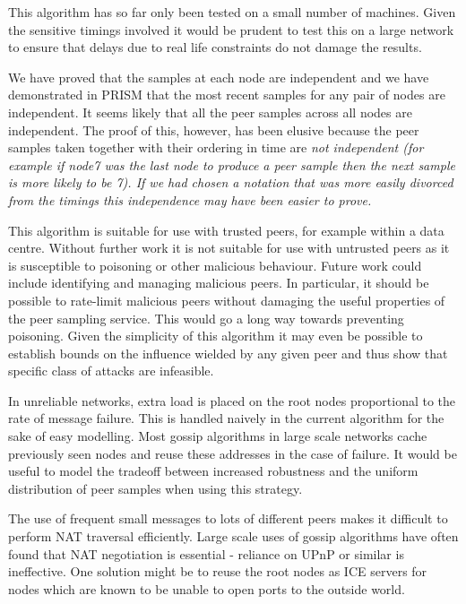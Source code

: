 \documentclass[a4paper,10pt]{article}
\begin{document}
This algorithm has so far only been tested on a small number of machines. Given the sensitive timings involved it would be prudent to test this on a large network to ensure that delays due to real life constraints do not damage the results.

We have proved that the samples at each node are independent and we have demonstrated in PRISM that the most recent samples for any pair of nodes are independent. It seems likely that all the peer samples across all nodes are independent. The proof of this, however, has been elusive because the peer samples taken together with their ordering in time are \em not \em independent (for example if node7 was the last node to produce a peer sample then the next sample is more likely to be 7). If we had chosen a notation that was more easily divorced from the timings this independence may have been easier to prove.

This algorithm is suitable for use with trusted peers, for example within a data centre. Without further work it is not suitable for use with untrusted peers as it is susceptible to poisoning or other malicious behaviour. Future work could include identifying and managing malicious peers. In particular, it should be possible to rate-limit malicious peers without damaging the useful properties of the peer sampling service. This would go a long way towards preventing poisoning. Given the simplicity of this algorithm it may even be possible to establish bounds on the influence wielded by any given peer and thus show that specific class of attacks are infeasible. 

In unreliable networks, extra load is placed on the root nodes proportional to the rate of message failure. This is handled naively in the current algorithm for the sake of easy modelling. Most gossip algorithms in large scale networks cache previously seen nodes and reuse these addresses in the case of failure. It would be useful to model the tradeoff between increased robustness and the uniform distribution of peer samples when using this strategy.

The use of frequent small messages to lots of different peers makes it difficult to perform NAT traversal efficiently. Large scale uses of gossip algorithms have often found that NAT negotiation is essential \cite{arrg, tribler} - reliance on UPnP or similar is ineffective. One solution might be to reuse the root nodes as ICE servers for nodes which are known to be unable to open ports to the outside world.
\end{document}
